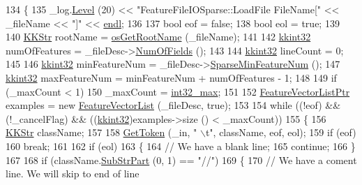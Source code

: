 \begin{DoxyCode}
134 \{
135   \_log.\hyperlink{class_k_k_b_1_1_run_log_a32cf761d7f2e747465fd80533fdbb659}{Level} (20) << \textcolor{stringliteral}{"FeatureFileIOSparse::LoadFile   FileName["} << \_fileName << \textcolor{stringliteral}{"]"} << 
      \hyperlink{namespace_k_k_b_ad1f50f65af6adc8fa9e6f62d007818a8}{endl};
136 
137   \textcolor{keywordtype}{bool}  eof = \textcolor{keyword}{false};
138   \textcolor{keywordtype}{bool}  eol = \textcolor{keyword}{true};
139 
140   \hyperlink{class_k_k_b_1_1_k_k_str}{KKStr}  rootName = \hyperlink{namespace_k_k_b_af5b668ed9902d7f93b62529664a739f0}{osGetRootName} (\_fileName);
141 
142   \hyperlink{namespace_k_k_b_a8fa4952cc84fda1de4bec1fbdd8d5b1b}{kkint32}  numOfFeatures = \_fileDesc->\hyperlink{class_k_k_m_l_l_1_1_file_desc_a07abdfb77949dee565c555c7651581c2}{NumOfFields} ();
143 
144   \hyperlink{namespace_k_k_b_a8fa4952cc84fda1de4bec1fbdd8d5b1b}{kkint32}  lineCount = 0;
145 
146   \hyperlink{namespace_k_k_b_a8fa4952cc84fda1de4bec1fbdd8d5b1b}{kkint32}  minFeatureNum = \_fileDesc->\hyperlink{class_k_k_m_l_l_1_1_file_desc_a5544aa7b42d2486b09b1dcfa08837367}{SparseMinFeatureNum} ();
147   \hyperlink{namespace_k_k_b_a8fa4952cc84fda1de4bec1fbdd8d5b1b}{kkint32}  maxFeatureNum = minFeatureNum + numOfFeatures - 1;
148 
149   \textcolor{keywordflow}{if}  (\_maxCount < 1)
150     \_maxCount = \hyperlink{_k_k_base_types_8h_ab1240c5d3fea865121ed4684f8e968f6}{int32\_max};
151 
152   \hyperlink{class_k_k_m_l_l_1_1_feature_vector_list}{FeatureVectorListPtr}  examples = \textcolor{keyword}{new} \hyperlink{class_k_k_m_l_l_1_1_feature_vector_list}{FeatureVectorList} (\_fileDesc, \textcolor{keyword}{
      true});
153 
154   \textcolor{keywordflow}{while}  ((!eof)   &&  (!\_cancelFlag)  &&  ((\hyperlink{namespace_k_k_b_a8fa4952cc84fda1de4bec1fbdd8d5b1b}{kkint32})examples->size () < \_maxCount))
155   \{
156     \hyperlink{class_k_k_b_1_1_k_k_str}{KKStr}  className;
157     
158     \hyperlink{class_k_k_m_l_l_1_1_feature_file_i_o_ae79ac82b32e63fa7e7d96c833b5631f2}{GetToken} (\_in, \textcolor{stringliteral}{" \(\backslash\)t"}, className, eof, eol);
159     \textcolor{keywordflow}{if}  (eof)
160       \textcolor{keywordflow}{break};
161 
162     \textcolor{keywordflow}{if}  (eol)
163     \{
164       \textcolor{comment}{// We have a blank line;}
165       \textcolor{keywordflow}{continue};
166     \}
167 
168     \textcolor{keywordflow}{if}  (className.\hyperlink{class_k_k_b_1_1_k_k_str_a5f20b2ddfc9f07c8ef99592810332ddb}{SubStrPart} (0, 1) == \textcolor{stringliteral}{"//"})
169     \{
170       \textcolor{comment}{// We have a coment line.  We will skip to end of line}

\end{DoxyCode}
